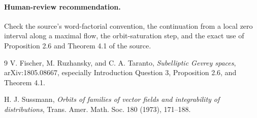 \documentclass[11pt]{article}
\begin{document}
\paragraph{Human-review recommendation.}
Check the source's word-factorial convention, the continuation from a local
zero interval along a maximal flow, the orbit-saturation step, and the exact
use of Proposition 2.6 and Theorem 4.1 of the source.

\begin{thebibliography}{9}
V. Fischer, M. Ruzhansky, and C. A. Taranto,
\emph{Subelliptic Gevrey spaces}, arXiv:1805.08667,
especially Introduction Question 3,
Proposition 2.6, and Theorem 4.1.

H. J. Sussmann,
\emph{Orbits of families of vector fields and integrability of distributions},
Trans. Amer. Math. Soc. 180 (1973), 171--188.
\end{thebibliography}
\end{document}

